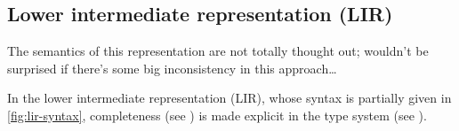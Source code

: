 \documentclass[index.tex]{subfiles}
\begin{document}
\newcommand{\EWrapIntoNI}[1]{\ensuremath{\SyWrap^{\CNI}~ #1}}
\newcommand{\EWrapIntoII}[1]{\ensuremath{\SyWrap^{\CII}~ #1}}
\newcommand{\EEmbed}[1]{\ensuremath{\SyEmbed~ #1}}
\newcommand{\EProj}[2]{\ensuremath{\SyProj[#2]~ #1}}

\newcommand{\EPlus}[2]{\ensuremath{#1 \SyPlus #2}}
\newcommand{\ETimes}[2]{\ensuremath{#1 \SyTimes #2}}
\newcommand{\EFPlus}[2]{\ensuremath{#1 \SyFPlus #2}}
\newcommand{\EFTimes}[2]{\ensuremath{#1 \SyFTimes #2}}

\newcommand{\ETrue}{\ensuremath{\SyTrue}}
\newcommand{\EAnd}[2]{\ensuremath{#1 \SyAnd #2}}
\newcommand{\EOr}[2]{\ensuremath{#1 \SyOr #2}}

\newcommand{\EPair}[2]{\ensuremath{(#1, #2)}}
\newcommand{\EProjL}[1]{\ensuremath{\SyProjL~ #1}}
\newcommand{\EProjR}[1]{\ensuremath{\SyProjR~ #1}}

\newcommand{\EFun}[3]{\ensuremath{\SyFun #1 : #2 \SyDot~ #3}}
\newcommand{\EAp}[2]{\ensuremath{#1 ~#2}}

\newcommand{\EEHole}[2]{\ensuremath{\SyEHole{#1}{#2}}}

\newcommand{\EVarNamed}[2]{\ensuremath{t_{#1}^{{\color{gray}#2}}}}

\subsection{Lower intermediate representation (LIR)}
\label{sec:lir}

\begin{note}
  The semantics of this representation are not totally thought out; wouldn't be surprised if there's
  some big inconsistency in this approach\ldots
\end{note}

In the lower intermediate representation (LIR), whose syntax is partially given in
\cref{fig:lir-syntax}, completeness (see ) is made explicit in the type
system (see ).
\end{document}
